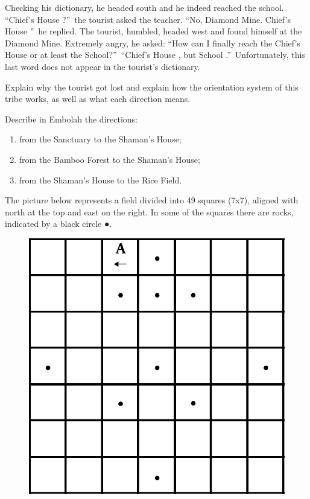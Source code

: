 \begin{refsection}
\begin{problem}{\langnameEmbaloh}{\nameKGilyarova}{}
Checking his dictionary, he headed south and he indeed reached the school. “Chief's House ?”\ the tourist asked the teacher. “No,  Diamond Mine. Chief's House ”\ he replied. The tourist, humbled, headed west and found himself at the Diamond Mine. Extremely angry, he asked: “How can I finally reach the Chief's House or at least the School?”\ “Chief's House , but School .”\ Unfortunately, this last word does not appear in the tourist's dictionary.

\begin{assgts}
\item Explain why the tourist got lost and explain how the orientation system of this tribe works, as well as what each direction means.
\item Describe in Embolah the directions:
\begin{enumerate}
    \item from the Sanctuary to the Shaman's House;
    \item from the Bamboo Forest to the Shaman's House;
    \item from the Shaman's House to the Rice Field.
\end{enumerate}
\end{assgts}
\end{problem}\largerpage[2]

\begin{problem}{\langnameHungarian}{\nameAHesterberg}{}
The picture below represents a field divided into 49 squares (7x7), aligned with north at the top and east on the right. In some of the squares there are rocks, indicated by a black circle ●. 

\begin{figure}[H]
\includegraphics[width = 6 cm]{figures/Hungarian_Squares.pdf}
\end{figure}


\end{problem}
\end{refsection}
